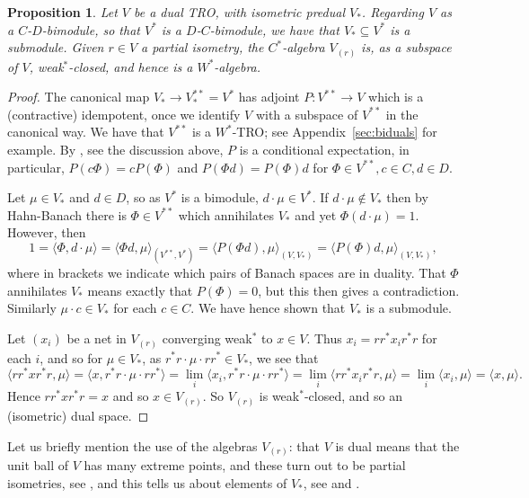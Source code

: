 \documentclass[a4paper,11pt]{article}
\theoremstyle{plain}
\newtheorem{proposition}{Proposition}[section]
\theoremstyle{remark}
\newcommand{\ip}[2]{{\langle {#1} , {#2} \rangle}}
\begin{document}
\begin{proposition}\label{prop:Vr_vnalg}
Let $V$ be a dual TRO, with isometric predual $V_*$.  Regarding $V$ as a $C$-$D$-bimodule, so that $V^*$ is a $D$-$C$-bimodule, we have that $V_* \subseteq V^*$ is a submodule.  Given $r\in V$ a partial isometry, the $C^*$-algebra $V_{(r)}$ is, as a subspace of $V$, weak$^*$-closed, and hence is a $W^*$-algebra.
\end{proposition}
\begin{proof}
The canonical map $V_* \to V_*^{**} = V^*$ has adjoint $P \colon V^{**} \to V$ which is a (contractive) idempotent, once we identify $V$ with a subspace of $V^{**}$ in the canonical way.  We have that $V^{**}$ is a $W^*$-TRO; see Appendix~\ref{sec:biduals} for example.  By \cite[Theorem~2.5]{EOR_InjectivityNuclearityOS}, see the discussion above, $P$ is a conditional expectation, in particular, $P(c\Phi) = c P(\Phi)$ and $P(\Phi d) = P(\Phi) d$ for $\Phi \in V^{**}, c\in C, d \in D$.

Let $\mu\in V_*$ and $d\in D$, so as $V^*$ is a bimodule, $d\cdot\mu\in V^*$.  If $d\cdot\mu \not\in V_*$ then by Hahn-Banach there is $\Phi \in V^{**}$ which annihilates $V_*$ and yet $\Phi(d\cdot\mu) = 1$.  However, then
\[ 1 = \ip{\Phi}{d\cdot \mu} = \ip{\Phi d}{\mu}_{(V^{**}, V^*)} = \ip{P(\Phi d)}{\mu}_{(V,V_*)}
= \ip{P(\Phi)d}{\mu}_{(V,V_*)}, \]
where in brackets we indicate which pairs of Banach spaces are in duality.  That $\Phi$ annihilates $V_*$ means exactly that $P(\Phi) = 0$, but this then gives a contradiction.  Similarly $\mu\cdot c\in V_*$ for each $c\in C$.  We have hence shown that $V_*$ is a submodule.

Let $(x_i)$ be a net in $V_{(r)}$ converging weak$^*$ to $x\in V$.  Thus $x_i = rr^* x_i r^*r$ for each $i$, and so for $\mu\in V_*$, as $r^*r \cdot \mu \cdot rr^* \in V_*$, we see that
\[ \ip{rr^* x r^*r}{\mu} = \ip{x}{r^*r \cdot \mu \cdot rr^*} = \lim_i \ip{x_i}{r^*r \cdot \mu \cdot rr^*}
= \lim_i \ip{rr^* x_i r^*r}{\mu}
= \lim_i \ip{x_i}{\mu} = \ip{x}{\mu}. \]
Hence $rr^* x r^*r = x$ and so $x\in V_{(r)}$.  So $V_{(r)}$ is weak$^*$-closed, and so an (isometric) dual space.
\end{proof}

Let us briefly mention the use of the algebras $V_{(r)}$: that $V$ is dual means that the unit ball of $V$ has many extreme points, and these turn out to be partial isometries, see \cite[Lemma~1.3]{Zettl_TROs}, and this tells us about elements of $V_*$, see \cite[Proposition~4.3]{Zettl_TROs} and \cite[Proposition~2.3]{EOR_InjectivityNuclearityOS}.
\end{document}
